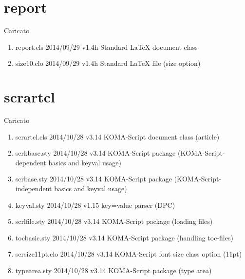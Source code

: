 	\section{report}
	
	Caricato
	\begin{enumerate}
		\item 		report.cls 2014/09/29 v1.4h Standard LaTeX document class
		\item 	size10.clo 2014/09/29 v1.4h Standard LaTeX file (size option)
	\end{enumerate}
		\section{scrartcl}
		
		Caricato
		\begin{enumerate}
	\item 	scrartcl.cls 2014/10/28 v3.14 KOMA-Script document class (article)
	\item 	scrkbase.sty 2014/10/28 v3.14 KOMA-Script package (KOMA-Script-dependent basics and keyval usage)
	\item 	scrbase.sty 2014/10/28 v3.14 KOMA-Script package (KOMA-Script-independent basics and keyval usage)
	\item 	keyval.sty 2014/10/28 v1.15 key=value parser (DPC)
	\item 	scrlfile.sty 2014/10/28 v3.14 KOMA-Script package (loading files)
	\item 	tocbasic.sty 2014/10/28 v3.14 KOMA-Script package (handling toc-files)
	\item 	scrsize11pt.clo 2014/10/28 v3.14 KOMA-Script font size class option (11pt)
	\item 	typearea.sty 2014/10/28 v3.14 KOMA-Script package (type area)
		\end{enumerate}
